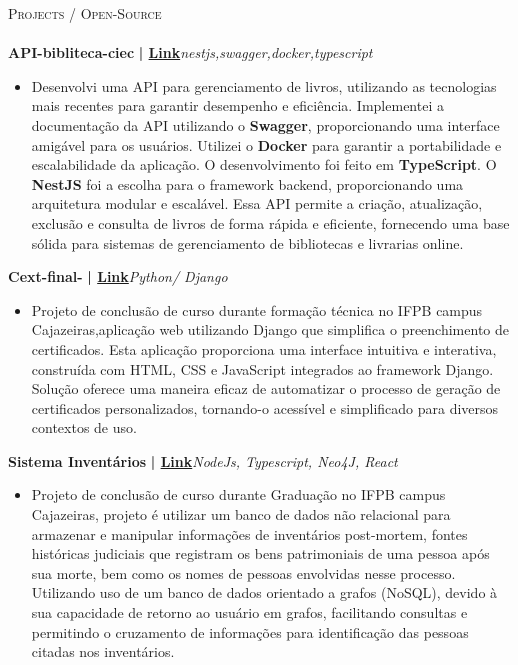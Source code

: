 \documentclass[a4paper]{article}
\newcommand{\lineunder} {
    \vspace*{-8pt} \\
    \hspace*{-18pt} \hrulefill \\
}
\newcommand{\header} [1] {
    {\hspace*{-18pt}\vspace*{6pt} \textsc{#1}}
    \vspace*{-6pt} \lineunder
}
\begin{document}
%
%
\header{Projects / Open-Source}
\vspace{2mm}
{\textbf{API-bibliteca-ciec}}\textbf{ | \href{https://github.com/Alttabcorp/API-bibliteca_siec}{Link}}\hfill{\sl nestjs,swagger,docker,typescript}\\
\vspace{-3mm}
\begin{itemize} \itemsep -3pt
    \item[] Desenvolvi uma API para gerenciamento de livros, utilizando as tecnologias mais recentes para garantir desempenho e eficiência. 
        Implementei a documentação da API utilizando o \textbf{Swagger}, proporcionando uma interface amigável para os usuários. Utilizei o \textbf{Docker} para garantir a portabilidade e escalabilidade da aplicação. 
        O desenvolvimento foi feito em \textbf{TypeScript}. O \textbf{NestJS} foi a escolha para o framework backend, proporcionando uma arquitetura modular e escalável. 
        Essa API permite a criação, atualização, exclusão e consulta de livros de forma rápida e eficiente, fornecendo uma base sólida para sistemas de gerenciamento de bibliotecas e livrarias online.
\end{itemize}
\vspace*{3mm}
{\textbf{Cext-final-}}\textbf{ | \href{https://github.com/bodescorp/Cext-final-}{Link}}\hfill{\sl Python/ Django }\\
\vspace{-3mm}
\begin{itemize} \itemsep -3pt
    \item[] Projeto de conclusão de curso durante formação técnica no IFPB campus Cajazeiras,aplicação web utilizando Django que simplifica o preenchimento de certificados. Esta aplicação proporciona uma interface intuitiva 
            e interativa, construída com HTML, CSS e JavaScript integrados ao framework Django. Solução oferece uma maneira eficaz de automatizar o processo de geração de certificados personalizados, tornando-o acessível e 
            simplificado para diversos contextos de uso.
\end{itemize}
\vspace*{3mm}
{\textbf{Sistema Inventários}}\textbf{ | \href{https://repositorio.ifpb.edu.br/handle/177683/2898}{Link}}\hfill{\sl NodeJs, Typescript, Neo4J, React }\\
\vspace{-3mm}
\begin{itemize} \itemsep -3pt
    \item[] Projeto de conclusão de curso durante Graduação no IFPB campus Cajazeiras, projeto é utilizar um banco de dados não relacional para armazenar e manipular informações de inventários post-mortem, fontes históricas judiciais 
        que registram os bens patrimoniais de uma pessoa após sua morte, bem como os nomes de pessoas envolvidas nesse processo. Utilizando uso de um banco de dados orientado a grafos (NoSQL), devido à sua capacidade de retorno ao usuário em grafos, 
        facilitando consultas e permitindo o cruzamento de informações para identificação das pessoas citadas nos inventários.
\end{itemize}
\end{document}
